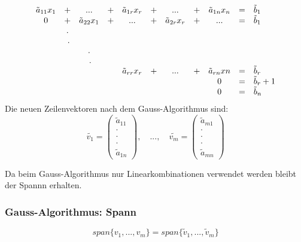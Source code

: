 \documentclass[12pt,a4paper]{report}%
\numberwithin{equation}{section}
\def\vecT#1{\left(\begin{array}{c} #1 \end{array}\right)}
\def\dddot{\cdot \\ \cdot \\ \cdot}
\def\vecDt#1#2{\vecT{#1 \\ \dddot \\ #2}}
\def\vspan#1{span \lbrace #1 \rbrace}
\numberwithin{equation}{subsection}
\begin{document}
	   \begin{align}
	     \begin{array}{c c c c c c c c c c l}
	       \tilde{a}_{11} x_1 & +   & ...                & + & \tilde{a}_{1r} x_r & + & ...                & + & \tilde{a}_{1n} x_n   & = & \tilde{b}_1\\
	       0                  & +   & \tilde{a}_{22} x_1 & + & ...                & + & \tilde{a}_{2r} x_r & + & ...                  & = & \tilde{b}_1\\
	       \;                 & .   & \;                 &\; & \;                 &\; & \;                 &\; & \;                   &\; & \;         \\
	       \;                 &\; . & \;                 &\; & \;                 &\; & \;                 &\; & \;                   &\; & \;         \\
	       \;                 &\;   & .                  &\; & \;                 &\; & \;                 &\; & \;                   &\; & \;         \\
	       \;                 &\;   & \;.                &\; & \;                 &\; & \;                 &\; & \;                   &\; & \;         \\
	       \;                 &\;   & \;                 &\, & \tilde{a}_{rr} x_r & + & ...                & + & \tilde{a}_{rn} xn    & = & \tilde{b}_r\\
	       \;                 &\;   & \;                 &\; & \;                 &\; & \;                 &\; & 0                    & = & \tilde{b}_r + 1\\ 
	       \;                 &\;   & \;                 &\; & \;                 &\; & \;                 &\; & 0                    & = & \tilde{b}_n\\
	     \end{array}
	   \end{align}
	   Die neuen Zeilenvektoren nach dem Gauss-Algorithmus sind:
	   \begin{equation}
	     \tilde{v_1} = \vecDt{\tilde{a}_{11}}{\tilde{a}_{1n}}, \quad ..., \quad \tilde{v_m} = \vecDt{\tilde{a}_{m1}}{\tilde{a}_{mn}}
	   \end{equation}
	   
	   Da beim Gauss-Algorithmus nur Linearkombinationen verwendet werden bleibt der Spannn erhalten.
	   
	   \subsubsection{Gauss-Algorithmus: Spann}
	   \begin{equation}
	     \vspan{v_1, ..., v_m} = \vspan{\tilde{v}_1,...,\tilde{v}_m}
	   \end{equation}
	   
\end{document}
